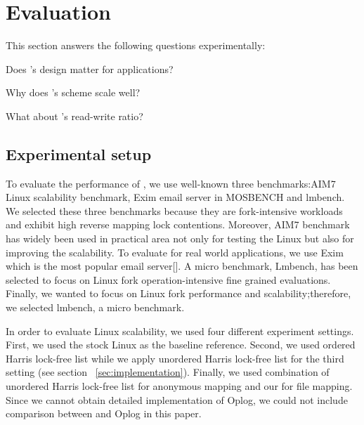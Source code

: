 \section{Evaluation}


This section answers the following questions experimentally:
\begin{CompactItemize}
\item Does \ldu's design matter for applications?

\item Why does \ldu's scheme scale well?

\item What about \ldu's read-write ratio?
\end{CompactItemize}

\subsection{Experimental setup}


\ifkor
To evaluate the performance of , we use well-known
three benchmarks:AIM7 Linux scalability benchmark, Exim email server in
MOSBENCH and lmbench.
We selected these three benchmarks because they are fork-intensive workloads and
exhibit high reverse mapping lock contentions.
Moreover, AIM7 benchmark has widely been used in practical area not only for testing the
Linux but also for improving the scalability. 
To evaluate  for real world
applications, we use Exim which is the most popular email server[].
A micro benchmark, Lmbench, has been selected to focus on Linux fork operation-intensive
fine grained evaluations.
Finally, we wanted to focus on Linux fork performance and scalability;therefore,
we selected lmbench, a micro benchmark.
\else
\fi

\ifkor
In order to evaluate Linux scalability, we used four different experiment
settings.
First, we used the stock Linux as the baseline reference. 
Second, we used ordered Harris lock-free list while 
we apply unordered Harris lock-free list for the third setting
(see section ~\ref{sec:implementation}). 
Finally, we used combination of unordered Harris lock-free list for anonymous mapping and
our  for file mapping.
Since we cannot obtain detailed implementation of Oplog, 
we could not include comparison between  and Oplog in this paper.
\else
\fi

